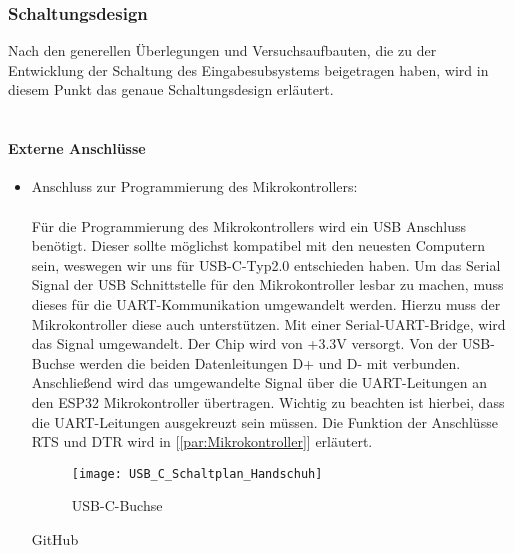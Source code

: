\documentclass[titlepage,12pt,twoside]{article}
\begin{document}
\newpage
\subsubsection{Schaltungsdesign}
Nach den generellen Überlegungen und Versuchsaufbauten, die zu der Entwicklung der Schaltung des Eingabesubsystems beigetragen haben, wird in diesem Punkt 
das genaue Schaltungsdesign erläutert. \\
\\
\paragraph{Externe Anschlüsse}
\label{par:Externe Anschlüsse}
\hfill \break
\hfill \break
\begin{itemize}
	\item Anschluss zur Programmierung des Mikrokontrollers: \\
		  \\
		  Für die Programmierung des Mikrokontrollers wird ein USB Anschluss benötigt. Dieser sollte möglichst kompatibel mit
		  den neuesten Computern sein, weswegen wir uns für USB-C-Typ2.0 entschieden haben. Um das Serial Signal der USB Schnittstelle
		  für den Mikrokontroller lesbar zu machen, muss dieses für die UART-Kommunikation umgewandelt werden. Hierzu muss der Mikrokontroller
		  diese auch unterstützen. Mit einer Serial-UART-Bridge, wird das Signal umgewandelt. Der Chip wird von +3.3V versorgt.
		  Von der USB-Buchse werden die beiden Datenleitungen D+ und D- mit verbunden. Anschließend wird das umgewandelte Signal 
		  über die UART-Leitungen an den ESP32 Mikrokontroller übertragen. Wichtig zu beachten ist hierbei, dass die UART-Leitungen
		  ausgekreuzt sein müssen. Die Funktion der Anschlüsse RTS und DTR wird in [\textcolor{blue}{\autoref{par:Mikrokontroller}}] erläutert. \\
		  \begin{figure}[H]
			\begin{center}
				\scalebox{0.5}
				{\texttt{[image: USB\_C\_Schaltplan\_Handschuh]}}
				\caption{USB-C-Buchse}
				\label{fig:USB_C_Schaltplan_Handschuh}				
			\end{center}
		\end{figure}
 GitHub\end{itemize}
\end{document}
